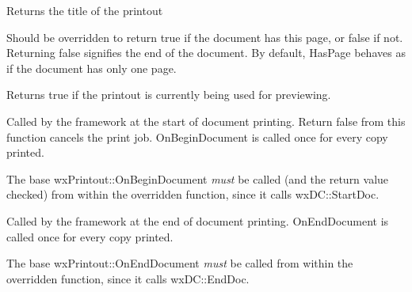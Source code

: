 \label{wxprintoutgettitle}


Returns the title of the printout




\label{wxprintouthaspage}


Should be overridden to return true if the document has this page, or false
if not. Returning false signifies the end of the document. By default,
HasPage behaves as if the document has only one page.


\label{wxprintoutispreview}


Returns true if the printout is currently being used for previewing.


\label{wxprintoutonbegindocument}


Called by the framework at the start of document printing. Return false from
this function cancels the print job. OnBeginDocument is called once for every
copy printed.

The base wxPrintout::OnBeginDocument {\it must} be called (and the return value
checked) from within the overridden function, since it calls wxDC::StartDoc.



\label{wxprintoutonenddocument}


Called by the framework at the end of document printing. OnEndDocument
is called once for every copy printed.

The base wxPrintout::OnEndDocument {\it must} be called
from within the overridden function, since it calls wxDC::EndDoc.


\label{wxprintoutonbeginprinting}

